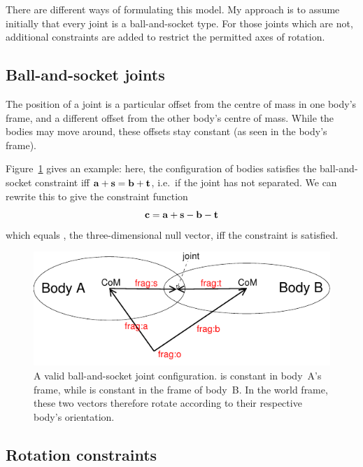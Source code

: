 There are different ways of formulating this model. My approach is to assume initially that every
joint is a ball-and-socket type. For those joints which are not, additional constraints are
added to restrict the permitted axes of rotation.

\subsection{Ball-and-socket joints}

The position of a joint is a particular offset from the centre of mass in one body's frame, and a
different offset from the other body's centre of mass. While the bodies may move around, these
offsets stay constant (as seen in the body's frame).

Figure~\ref{ballAndSocketFigure} gives an example: here, the configuration of bodies satisfies the
ball-and-socket constraint iff $\ve{a}+\ve{s} = \ve{b}+\ve{t}$, i.e.\ if the joint has not
separated. We can rewrite this to give the constraint function
\begin{equation}
\ve{c} = \ve{a} + \ve{s} - \ve{b} - \ve{t}
\end{equation}
which equals , the three-dimensional null vector, iff the constraint is satisfied.

\begin{figure}
\centerline{\includegraphics{figures/joint2}}
\caption[]{A valid ball-and-socket joint configuration.  is constant in body~A's frame,
    while  is constant in the frame of body~B. In the world frame, these two vectors
    therefore rotate according to their respective body's orientation.\label{ballAndSocketFigure}}
\end{figure}

\subsection{Rotation constraints\label{rotationConstraints}}

